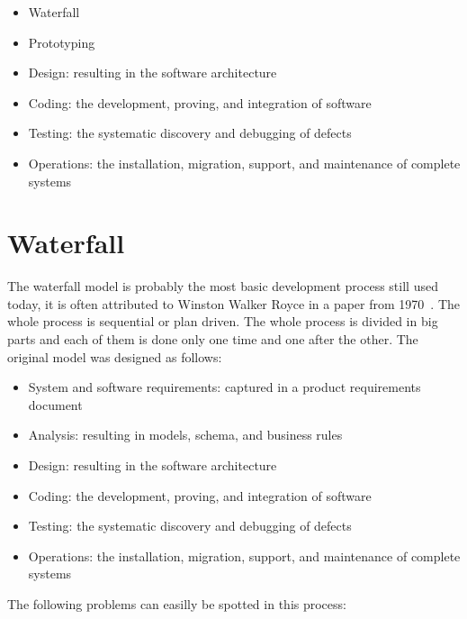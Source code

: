 \documentclass[12pt]{article}
\theoremstyle{definition}
\theoremstyle{definition}
\theoremstyle{remark}
\begin{document}
\begin{itemize}
\item Waterfall
\item Prototyping
\item Design: resulting in the software architecture
\item Coding: the development, proving, and integration of software
\item Testing: the systematic discovery and debugging of defects
\item Operations: the installation, migration, support, and maintenance of complete systems
\end{itemize}


\clearpage



\section{Waterfall}


The waterfall model is probably the most basic development process still used today, it is often attributed to Winston Walker Royce in a paper from 1970~\cite{BARYWBoehm:1987}. The whole process is sequential or plan driven. The whole process is divided in big parts and each of them is done only one time and one after the other. The original model was designed as follows:\\

\begin{itemize}

\item System and software requirements: captured in a product requirements document
\item Analysis: resulting in models, schema, and business rules
\item Design: resulting in the software architecture
\item Coding: the development, proving, and integration of software
\item Testing: the systematic discovery and debugging of defects
\item Operations: the installation, migration, support, and maintenance of complete systems

\end{itemize}

The following problems can easilly be spotted in this process:
\end{document}
